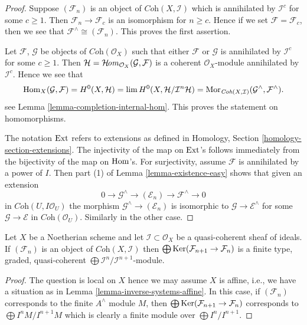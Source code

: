 \begin{proof}
Suppose $(\mathcal{F}_n)$ is an object of $\textit{Coh}(X, \mathcal{I})$
which is annihilated by $\mathcal{I}^c$ for some $c \geq 1$. Then
$\mathcal{F}_n \to \mathcal{F}_c$ is an isomorphism for $n \geq c$.
Hence if we set $\mathcal{F} = \mathcal{F}_c$, then we see that
$\mathcal{F}^\wedge \cong (\mathcal{F}_n)$. This proves the first assertion.

\medskip\noindent
Let $\mathcal{F}$, $\mathcal{G}$ be objects of $\textit{Coh}(\mathcal{O}_X)$
such that either $\mathcal{F}$ or $\mathcal{G}$ is annihilated by
$\mathcal{I}^c$ for some $c \geq 1$. Then
$\mathcal{H} = \mathop{\mathcal{H}\!\mathit{om}}\nolimits_{\mathcal{O}_X}(\mathcal{G}, \mathcal{F})$
is a coherent $\mathcal{O}_X$-module annihilated by $\mathcal{I}^c$.
Hence we see that
$$
\mathop{\mathrm{Hom}}\nolimits_X(\mathcal{G}, \mathcal{F}) =
H^0(X, \mathcal{H}) =
\mathop{\mathrm{lim}}\nolimits H^0(X, \mathcal{H}/\mathcal{I}^n\mathcal{H}) =
\mathop{\mathrm{Mor}}\nolimits_{\textit{Coh}(X, \mathcal{I})}
(\mathcal{G}^\wedge, \mathcal{F}^\wedge).
$$
see Lemma \ref{lemma-completion-internal-hom}.
This proves the statement on homomorphisms.

\medskip\noindent
The notation $\mathop{\mathrm{Ext}}\nolimits$ refers to extensions as defined in
Homology, Section \ref{homology-section-extensions}.
The injectivity of the map on $\mathop{\mathrm{Ext}}\nolimits$'s follows immediately
from the bijectivity of the map on $\mathop{\mathrm{Hom}}\nolimits$'s.
For surjectivity, assume $\mathcal{F}$ is annihilated
by a power of $I$. Then part (1) of Lemma \ref{lemma-existence-easy}
shows that given an extension
$$
0 \to \mathcal{G}^\wedge \to (\mathcal{E}_n) \to \mathcal{F}^\wedge \to 0
$$
in $\textit{Coh}(U, I\mathcal{O}_U)$
the morphism $\mathcal{G}^\wedge \to (\mathcal{E}_n)$ is
isomorphic to $\mathcal{G} \to \mathcal{E}^\wedge$
for some $\mathcal{G} \to \mathcal{E}$ in $\textit{Coh}(\mathcal{O}_U)$.
Similarly in the other case.
\end{proof}

\begin{lemma}
\label{lemma-finite-over-rees-algebra}
Let $X$ be a Noetherian scheme and let $\mathcal{I} \subset \mathcal{O}_X$
be a quasi-coherent sheaf of ideals. If $(\mathcal{F}_n)$ is an object of
$\textit{Coh}(X, \mathcal{I})$ then
$\bigoplus \mathop{\mathrm{Ker}}(\mathcal{F}_{n + 1} \to \mathcal{F}_n)$ is
a finite type, graded, quasi-coherent
$\bigoplus \mathcal{I}^n/\mathcal{I}^{n + 1}$-module.
\end{lemma}

\begin{proof}
The question is local on $X$ hence we may assume $X$ is affine, i.e.,
we have a situation as in Lemma \ref{lemma-inverse-systems-affine}.
In this case, if $(\mathcal{F}_n)$ corresponds to the finite $A^\wedge$
module $M$, then $\bigoplus \mathop{\mathrm{Ker}}(\mathcal{F}_{n + 1} \to \mathcal{F}_n)$
corresponds to $\bigoplus I^nM/I^{n + 1}M$ which is clearly a finite
module over $\bigoplus I^n/I^{n + 1}$.
\end{proof}

